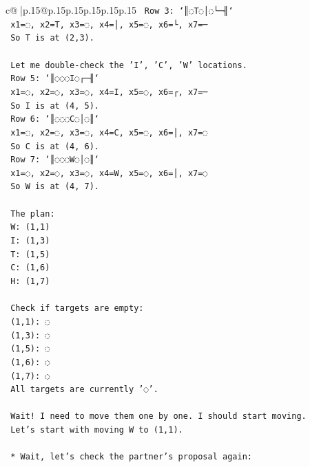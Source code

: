 \documentclass{article}
\begin{document}
{\begin{supertabular}{c@{$\;$}|p{.15\linewidth}@{}p{.15\linewidth}p{.15\linewidth}p{.15\linewidth}p{.15\linewidth}p{.15\linewidth}}
{{{\texttt{        Row 3: `║◌T◌│◌└─╢`} \\
\texttt{        x1=◌, x2=T, x3=◌, x4=│, x5=◌, x6=└, x7=─} \\
\texttt{        So T is at (2,3).} \\
\\ 
\texttt{        Let me double{-}check the 'I', 'C', 'W' locations.} \\
\texttt{        Row 5: `║◌◌◌I◌┌─╢`} \\
\texttt{        x1=◌, x2=◌, x3=◌, x4=I, x5=◌, x6=┌, x7=─} \\
\texttt{        So I is at (4, 5).} \\
\texttt{        Row 6: `║◌◌◌C◌│◌║`} \\
\texttt{        x1=◌, x2=◌, x3=◌, x4=C, x5=◌, x6=│, x7=◌} \\
\texttt{        So C is at (4, 6).} \\
\texttt{        Row 7: `║◌◌◌W◌│◌║`} \\
\texttt{        x1=◌, x2=◌, x3=◌, x4=W, x5=◌, x6=│, x7=◌} \\
\texttt{        So W is at (4, 7).} \\
\\ 
\texttt{        The plan:} \\
\texttt{        W: (1,1)} \\
\texttt{        I: (1,3)} \\
\texttt{        T: (1,5)} \\
\texttt{        C: (1,6)} \\
\texttt{        H: (1,7)} \\
\\ 
\texttt{        Check if targets are empty:} \\
\texttt{        (1,1): ◌} \\
\texttt{        (1,3): ◌} \\
\texttt{        (1,5): ◌} \\
\texttt{        (1,6): ◌} \\
\texttt{        (1,7): ◌} \\
\texttt{        All targets are currently '◌'.} \\
\\ 
\texttt{        Wait! I need to move them one by one. I should start moving.} \\
\texttt{        Let's start with moving W to (1,1).} \\
\\ 
\texttt{    *   Wait, let's check the partner's proposal again:} \\
}}}
\end{supertabular}}
\end{document}
